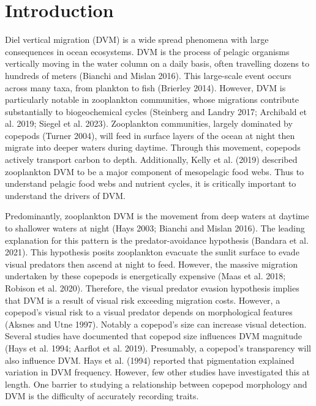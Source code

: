 \documentclass[
  letterpaper,
  DIV=11,
  numbers=noendperiod]{scrartcl}
\begin{document}
\hypertarget{introduction}{%
\section{Introduction}\label{introduction}}

Diel vertical migration (DVM) is a wide spread phenomena with large
consequences in ocean ecosystems. DVM is the process of pelagic
organisms vertically moving in the water column on a daily basis, often
travelling dozens to hundreds of meters (Bianchi and Mislan 2016). This
large-scale event occurs across many taxa, from plankton to fish
(Brierley 2014). However, DVM is particularly notable in zooplankton
communities, whose migrations contribute substantially to biogeochemical
cycles (Steinberg and Landry 2017; Archibald et al. 2019; Siegel et al.
2023). Zooplankton communities, largely dominated by copepods (Turner
2004), will feed in surface layers of the ocean at night then migrate
into deeper waters during daytime. Through this movement, copepods
actively transport carbon to depth. Additionally, Kelly et al. (2019)
described zooplankton DVM to be a major component of mesopelagic food
webs. Thus to understand pelagic food webs and nutrient cycles, it is
critically important to understand the drivers of DVM.

Predominantly, zooplankton DVM is the movement from deep waters at
daytime to shallower waters at night (Hays 2003; Bianchi and Mislan
2016). The leading explanation for this pattern is the
predator-avoidance hypothesis (Bandara et al. 2021). This hypothesis
posits zooplankton evacuate the sunlit surface to evade visual predators
then ascend at night to feed. However, the massive migration undertaken
by these copepods is energetically expensive (Maas et al. 2018; Robison
et al. 2020). Therefore, the visual predator evasion hypothesis implies
that DVM is a result of visual risk exceeding migration costs. However,
a copepod's visual risk to a visual predator depends on morphological
features (Aksnes and Utne 1997). Notably a copepod's size can increase
visual detection. Several studies have documented that copepod size
influences DVM magnitude (Hays et al. 1994; Aarflot et al. 2019).
Presumably, a copepod's transparency will also influence DVM. Hays et
al. (1994) reported that pigmentation explained variation in DVM
frequency. However, few other studies have investigated this at length.
One barrier to studying a relationship between copepod morphology and
DVM is the difficulty of accurately recording traits.
\end{document}
